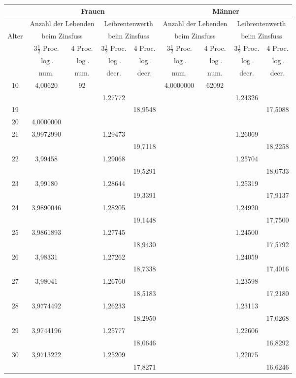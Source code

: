 \documentclass[12pt,a4paper]{article}
\newcommand{\Proc}{Proc.}
\begin{document}
\begin{center}
\small
\begin{tabular}{|c|c|c|c|c|c|c|c|c|}
\hline
 & \multicolumn{4}{c|}{Frauen} & \multicolumn{4}{c|}{Männer} \\
\hline
 & \multicolumn{2}{c|}{Anzahl der Lebenden} & \multicolumn{2}{c|}{Leibrentenwerth} & \multicolumn{2}{c|}{Anzahl der Lebenden} & \multicolumn{2}{c|}{Leibrentenwerth} \\
\hline
Alter & \multicolumn{2}{c|}{beim Zinsfuss} & \multicolumn{2}{c|}{beim Zinsfuss} & \multicolumn{2}{c|}{beim Zinsfuss} & \multicolumn{2}{c|}{beim Zinsfuss} \\
 & $3\frac{1}{2}$ \Proc & 4 \Proc & $3\frac{1}{2}$ \Proc & 4 \Proc & $3\frac{1}{2}$ \Proc & 4 \Proc & $3\frac{1}{2}$ \Proc & 4 \Proc \\
\hline
 & $\log.$ & $\log.$ & $\log.$ & $\log.$ & $\log.$ & $\log.$ & $\log.$ & $\log.$ \\
 & num. & num. & decr. & decr. & num. & num. & decr. & decr. \\
\hline
10 & 4,00620 & 92 & & & 4,0000000 & 62092 & & \\
 & & & 1,27772 & & & & 1,24326 & \\
19 & & & & 18,9548 & & & & 17,5088 \\
20 & 4,0000000 & & & & & & & \\
21 & 3,9972990 & & 1,29473 & & & & 1,26069 & \\
 & & & & 19,7118 & & & & 18,2258 \\
22 & 3,99458 & & 1,29068 & & & & 1,25704 & \\
 & & & & 19,5291 & & & & 18,0733 \\
23 & 3,99180 & & 1,28644 & & & & 1,25319 & \\
 & & & & 19,3391 & & & & 17,9137 \\
24 & 3,9890046 & & 1,28205 & & & & 1,24920 & \\
 & & & & 19,1448 & & & & 17,7500 \\
25 & 3,9861893 & & 1,27745 & & & & 1,24500 & \\
 & & & & 18,9430 & & & & 17,5792 \\
26 & 3,98331 & & 1,27262 & & & & 1,24059 & \\
 & & & & 18,7338 & & & & 17,4016 \\
27 & 3,98041 & & 1,26760 & & & & 1,23598 & \\
 & & & & 18,5183 & & & & 17,2180 \\
28 & 3,9774492 & & 1,26233 & & & & 1,23113 & \\
 & & & & 18,2950 & & & & 17,0268 \\
29 & 3,9744196 & & 1,25777 & & & & 1,22606 & \\
 & & & & 18,0646 & & & & 16,8292 \\
30 & 3,9713222 & & 1,25209 & & & & 1,22075 & \\
 & & & & 17,8271 & & & & 16,6246 \\
\hline
\end{tabular}
\end{center}
\end{document}
